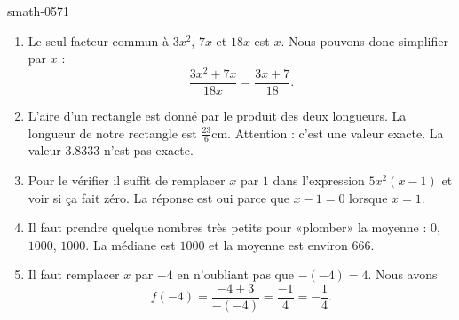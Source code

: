 
\begin{corrige}{smath-0571}

    \begin{enumerate}
        \item
            Le seul facteur commun à \( 3x^2\), \( 7x\) et \( 18x\) est \( x\). Nous pouvons donc simplifier par \( x\) :
            \begin{equation}
                \frac{ 3x^2+7x }{ 18x }=\frac{ 3x+7 }{ 18 }.
            \end{equation}
        \item
            L'aire d'un rectangle est donné par le produit des deux longueurs. La longueur de notre rectangle est \( \frac{ 23 }{ 6 }\)\si{\centi\meter}. Attention : c'est une valeur exacte. La valeur \( 3.8333\) n'est pas exacte.
        \item 
            Pour le vérifier il suffit de remplacer \( x\) par \( 1\) dans l'expression \( 5x^2(x-1)\) et voir si ça fait zéro. La réponse est oui parce que \( x-1=0\) lorsque \( x=1\).
        \item
            Il faut prendre quelque nombres très petits pour «plomber» la moyenne : \( 0\), \( 1000\), \( 1000\). La médiane est \( 1000\) et la moyenne est environ \( 666\).
        \item
            Il faut remplacer \( x\) par \( -4\) en n'oubliant pas que \( -(-4)=4\). Nous avons
            \begin{equation}
                f(-4)=\frac{ -4+3 }{ -(-4) }=\frac{ -1 }{ 4 }=-\frac{1}{ 4 }.
            \end{equation}
    \end{enumerate}

\end{corrige}
